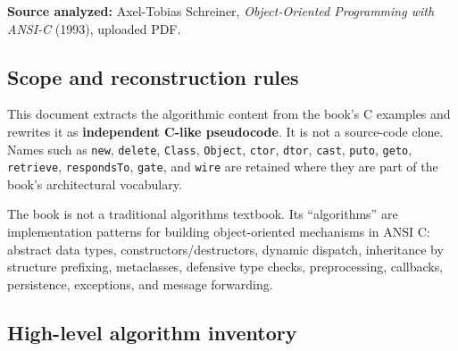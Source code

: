 \documentclass[11pt]{article}
\begin{document}
\textbf{Source analyzed:} Axel-Tobias Schreiner, \emph{Object-Oriented
Programming with ANSI-C} (1993), uploaded PDF.

\subsection{Scope and reconstruction
rules}\label{scope-and-reconstruction-rules}

This document extracts the algorithmic content from the book's C
examples and rewrites it as \textbf{independent C-like pseudocode}. It
is not a source-code clone. Names such as \texttt{new},
\texttt{delete}, \texttt{Class},
\texttt{Object}, \texttt{ctor},
\texttt{dtor}, \texttt{cast},
\texttt{puto}, \texttt{geto},
\texttt{retrieve},
\texttt{respondsTo}, \texttt{gate},
and \texttt{wire} are retained where they are part of
the book's architectural vocabulary.

The book is not a traditional algorithms textbook. Its ``algorithms''
are implementation patterns for building object-oriented mechanisms in
ANSI C: abstract data types, constructors/destructors, dynamic dispatch,
inheritance by structure prefixing, metaclasses, defensive type checks,
preprocessing, callbacks, persistence, exceptions, and message
forwarding.

\subsection{High-level algorithm
inventory}\label{high-level-algorithm-inventory}
\end{document}
